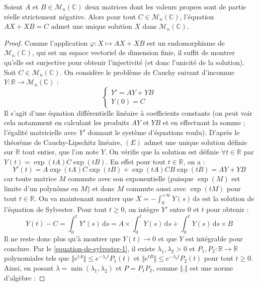 
  \begin{theorem}
    Soient $A$ et $B \in \mathcal{M}_n(\mathbb{C})$ deux matrices dont les valeurs propres sont de partie réelle strictement négative. Alors pour tout $C \in \mathcal{M}_n(\mathbb{C})$, l'équation $AX + XB = C$ admet une unique solution $X$ dans $\mathcal{M}_n(\mathbb{C})$.
  \end{theorem}

  \begin{proof}
    Comme l'application $\varphi : X \mapsto AX + XB$ est un endomorphisme de $\mathcal{M}_n(\mathbb{C})$, qui est un espace vectoriel de dimension finie, il suffit de montrer qu'elle est surjective pour obtenir l'injectivité (et donc l'unicité de la solution). Soit $C \in \mathcal{M}_n(\mathbb{C})$. On considère le problème de Cauchy suivant d'inconnue $Y : \mathbb{R} \rightarrow \mathcal{M}_n(\mathbb{C})$ :
    \[ \begin{cases} Y' = AY + YB \\ Y(0) = C \end{cases} \tag{$E$} \]
    Il s'agit d'une équation différentielle linéaire à coefficients constants (on peut voir cela notamment en calculant les produits $AY$ et $YB$ et en effectuant la somme ; l'égalité matricielle avec $Y'$ donnant le système d'équations voulu). D'après le théorème de Cauchy-Lipschitz linéaire, $(E)$ admet une unique solution définie sur $\mathbb{R}$ tout entier, que l'on note $Y$.
    \newpar
    On vérifie que la solution est définie $\forall t \in \mathbb{R}$ par $Y(t) = \exp(tA) C \exp(tB)$. En effet pour tout $t \in \mathbb{R}$, on a :
    \[ Y'(t) = A \exp(tA) C \exp(tB) + \exp(tA) CB \exp(tB) = AY + YB \]
    car toute matrice $M$ commute avec son exponentielle (puisque $\exp(M)$ est limite d'un polynôme en $M$) et donc $M$ commute aussi avec $\exp(tM)$ pour tout $t \in \mathbb{R}$.
    \newpar
    On va maintenant montrer que $X = - \int_{0}^{+\infty} Y(s) \, \mathrm{d}s$ est la solution de l'équation de Sylvester. Pour tout $t \geq 0$, on intègre $Y'$ entre $0$ et $t$ pour obtenir :
    \[ Y(t) - C = \int_0^t Y'(s) \, \mathrm{d}s = A \times \int_0^t Y(s) \, \mathrm{d}s + \int_0^t Y(s) \, \mathrm{d}s \times B \]
    Il ne reste donc plus qu'à montrer que $Y(t) \longrightarrow 0$ et que $Y$ est intégrable pour conclure. Par le \cref{equation-de-sylvester-1}, il existe $\lambda_1, \lambda_2 > 0$ et $P_1, P_2 : \mathbb{R} \rightarrow \mathbb{R}$ polynomiales tels que $\Vert e^{tA} \Vert \leq e^{- \lambda_1 t} P_1(t)$ et $\Vert e^{tB} \Vert \leq e^{-\lambda_2 t} P_2(t)$ pour tout $t \geq 0$. Ainsi, en posant $\lambda = \min(\lambda_1, \lambda_2)$ et $P = P_1 P_2$, comme $\Vert . \Vert$ est une norme d'algèbre :

\end{proof}
